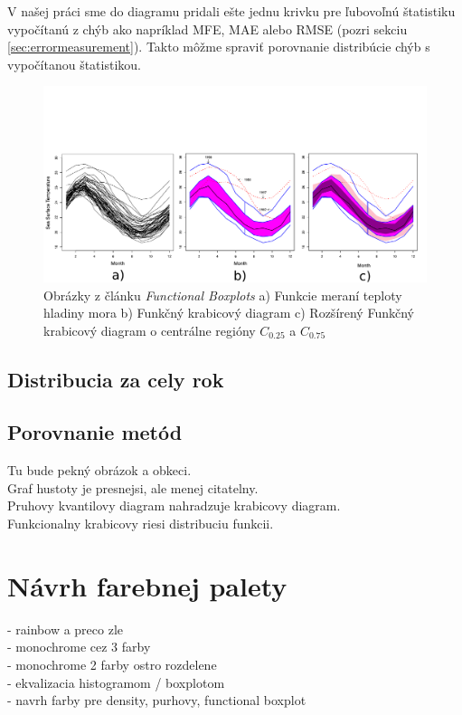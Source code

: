V našej práci sme do diagramu pridali ešte jednu krivku pre ľubovoľnú štatistiku vypočítanú z chýb ako napríklad MFE, MAE alebo RMSE (pozri sekciu \ref{sec:errormeasurement}). Takto môžme spraviť porovnanie distribúcie chýb s vypočítanou štatistikou.


\begin{figure}
	\centering
	\hspace*{-0.9in}
	\includegraphics[width = 7.5in]{functionalboxplot}
	\caption{Obrázky z článku \textit{Functional Boxplots}  \cite{FunctionalBoxplot}  a) Funkcie meraní teploty hladiny mora b) Funkčný krabicový diagram c) Rozšírený Funkčný krabicový diagram o centrálne regióny $ C_{0.25} $ a $ C_{0.75} $ }
	\label{fig:functionalboxplot}
\end{figure}



\subsection{Distribucia za cely rok} %


\subsection{Porovnanie metód}

Tu bude pekný obrázok a obkeci. \\
Graf hustoty je presnejsi, ale menej citatelny. \\
Pruhovy kvantilovy diagram nahradzuje krabicovy diagram. \\
Funkcionalny krabicovy riesi distribuciu funkcii.


\section{Návrh farebnej palety}
- rainbow a preco zle \\
- monochrome cez 3 farby \\
- monochrome 2 farby ostro rozdelene \\
- ekvalizacia histogramom / boxplotom \\
- navrh farby pre density, purhovy, functional boxplot \\

